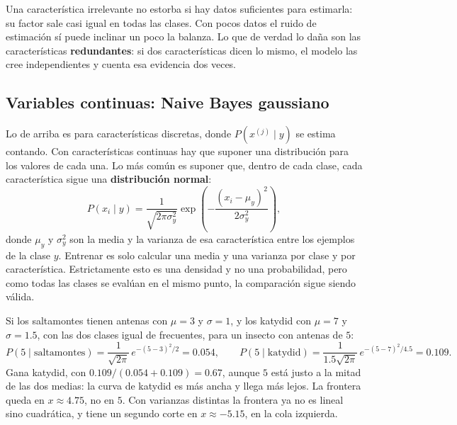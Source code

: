 \documentclass[11pt,letterpaper]{article}
\begin{document}
\begin{ojo}
    Una característica irrelevante no estorba si hay datos suficientes
    para estimarla: su factor sale casi igual en todas las clases.
    Con pocos datos el ruido de estimación sí puede inclinar un poco
    la balanza. Lo que de verdad lo daña son las características
    \textbf{redundantes}: si dos características dicen lo mismo, el
    modelo las cree independientes y cuenta esa evidencia dos veces.
\end{ojo}


\subsection*{Variables continuas: Naive Bayes gaussiano}

Lo de arriba es para características discretas, donde
$P(x^{(j)} \mid y)$ se estima contando. Con características continuas
hay que suponer una distribución para los valores de cada una. Lo más
común es suponer que, dentro de cada clase, cada característica sigue
una \textbf{distribución normal}:
\[
    P(x_i \mid y) = \frac{1}{\sqrt{2\pi\sigma_y^2}}
    \exp\!\left(-\frac{(x_i - \mu_y)^2}{2\sigma_y^2}\right) ,
\]
donde $\mu_y$ y $\sigma_y^2$ son la media y la varianza de esa
característica entre los ejemplos de la clase $y$. Entrenar es solo
calcular una media y una varianza por clase y por característica.
Estrictamente esto es una densidad y no una probabilidad, pero como
todas las clases se evalúan en el mismo punto, la comparación sigue
siendo válida.

\begin{ejemplo}
    Si los saltamontes tienen antenas con $\mu = 3$ y $\sigma = 1$, y
    los katydid con $\mu = 7$ y $\sigma = 1.5$, con las dos clases
    igual de frecuentes, para un insecto con antenas de $5$:
    \[
        P(5 \mid \text{saltamontes})
        = \frac{1}{\sqrt{2\pi}}\, e^{-(5-3)^2/2} = 0.054 ,
        \qquad
        P(5 \mid \text{katydid})
        = \frac{1}{1.5\sqrt{2\pi}}\, e^{-(5-7)^2/4.5} = 0.109 .
    \]
    Gana katydid, con $0.109 / (0.054 + 0.109) = 0.67$, aunque $5$
    está justo a la mitad de las dos medias: la curva de katydid es más
    ancha y llega más lejos. La frontera queda en $x \approx 4.75$, no
    en $5$. Con varianzas distintas la frontera ya no es lineal sino
    cuadrática, y tiene un segundo corte en $x \approx -5.15$, en la
    cola izquierda.
\end{ejemplo}
\end{document}
